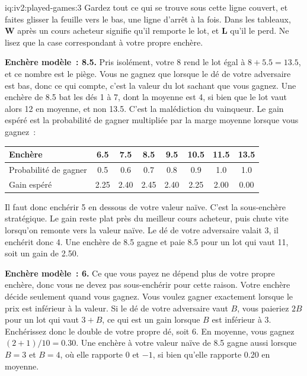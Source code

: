 \begin{solution}{iq:iv2:played-games:3}
Gardez tout ce qui se trouve sous cette ligne couvert, et faites glisser la feuille vers le bas, une ligne d'arrêt à la fois. Dans les tableaux, \textbf{W} après un cours acheteur signifie qu'il remporte le lot, et \textbf{L} qu'il le perd. Ne lisez que la case correspondant à votre propre enchère.

\ivstop

\textbf{Enchère modèle~: 8.5.} Pris isolément, votre 8 rend le lot égal à $8 + 5.5 = 13.5$, et ce nombre est le piège. Vous ne gagnez que lorsque le dé de votre adversaire est bas, donc ce qui compte, c'est la valeur du lot sachant que vous gagnez. Une enchère de 8.5 bat les dés 1 à 7, dont la moyenne est 4, si bien que le lot vaut alors 12 en moyenne, et non 13.5. C'est la malédiction du vainqueur. Le gain espéré est la probabilité de gagner multipliée par la marge moyenne lorsque vous gagnez~:
\begin{center}\small
\begin{tabular}{@{}l*{7}{c}@{}}
Enchère & 6.5 & 7.5 & 8.5 & 9.5 & 10.5 & 11.5 & 13.5 \\ \hline
Probabilité de gagner & 0.5 & 0.6 & 0.7 & 0.8 & 0.9 & 1.0 & 1.0 \\
Gain espéré & 2.25 & 2.40 & 2.45 & 2.40 & 2.25 & 2.00 & 0.00
\end{tabular}
\end{center}
Il faut donc enchérir 5 en dessous de votre valeur naïve. C'est la sous-enchère stratégique. Le gain reste plat près du meilleur cours acheteur, puis chute vite lorsqu'on remonte vers la valeur naïve. Le dé de votre adversaire valait 3, il enchérit donc 4. Une enchère de 8.5 gagne et paie 8.5 pour un lot qui vaut 11, soit un gain de 2.50.

\ivstop

\textbf{Enchère modèle~: 6.} Ce que vous payez ne dépend plus de votre propre enchère, donc vous ne devez pas sous-enchérir pour cette raison. Votre enchère décide seulement quand vous gagnez. Vous voulez gagner exactement lorsque le prix est inférieur à la valeur. Si le dé de votre adversaire vaut $B$, vous paieriez $2B$ pour un lot qui vaut $3 + B$, ce qui est un gain lorsque $B$ est inférieur à 3. Enchérissez donc le double de votre propre dé, soit 6. En moyenne, vous gagnez $(2 + 1)/10 = 0.30$. Une enchère à votre valeur naïve de 8.5 gagne aussi lorsque $B = 3$ et $B = 4$, où elle rapporte 0 et $-1$, si bien qu'elle rapporte 0.20 en moyenne.


\end{solution}
